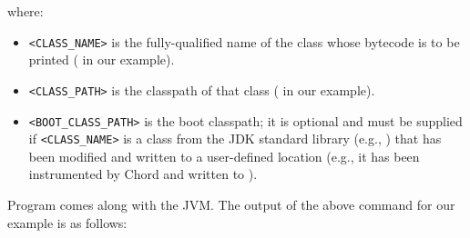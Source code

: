 where:

\begin{itemize}
\item
\verb+<CLASS_NAME>+ is the fully-qualified name of the class whose
bytecode is to be printed ( in our example).
\item
\verb+<CLASS_PATH>+ is the classpath of that class ( in our example).
\item
\verb+<BOOT_CLASS_PATH>+ is the boot classpath; it is optional and must be supplied if
\verb+<CLASS_NAME>+ is a class from the JDK standard library (e.g., ) that has
been modified and written to a user-defined location (e.g., it has been instrumented by Chord and
written to ).
\end{itemize}

Program  comes along with the JVM.  The output of the
above command for our example is as follows:

